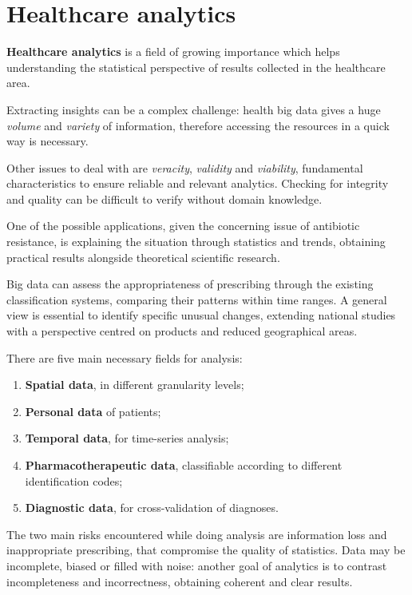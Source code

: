 \section{Healthcare analytics}
\textbf{Healthcare analytics} is a field of growing importance which helps understanding the statistical perspective of results collected in the healthcare area. 

Extracting insights can be a complex challenge: health big data gives a huge \textit{volume} and \textit{variety} of information, therefore accessing the resources in a quick way is necessary. 

Other issues to deal with are \textit{veracity}, \textit{validity} and \textit{viability}, fundamental characteristics to ensure reliable and relevant analytics. Checking for integrity and quality can be difficult to verify without domain knowledge\cite{4vs}.

One of the possible applications, given the concerning issue of antibiotic resistance, is explaining the situation through statistics and trends, obtaining practical results alongside theoretical scientific research. 

Big data can assess the appropriateness of prescribing through the existing classification systems, comparing their patterns within time ranges. A general view is essential to identify specific unusual changes, extending national studies with a perspective centred on products and reduced geographical areas.

There are five main necessary fields for analysis\cite{DC}:
\begin{enumerate}
	\item \textbf{Spatial data}, in different granularity levels;
	\item \textbf{Personal data} of patients;
	\item \textbf{Temporal data}, for time-series analysis;
	\item \textbf{Pharmacotherapeutic data}, classifiable according to different identification codes;
	\item \textbf{Diagnostic data}, for cross-validation of diagnoses.
\end{enumerate}

The two main risks encountered while doing analysis are information loss and inappropriate prescribing, that compromise the quality of statistics. Data may be incomplete, biased or filled with noise: another goal of analytics is to contrast incompleteness and incorrectness, obtaining coherent and clear results.
